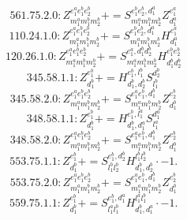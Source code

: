 \documentclass[letterpaper,10pt,fleqn,leqno,onecolumn]{article}
\begin{document}
\begin{equation} \;\;\;\;\;\;  561.75.2.0: Z^{e_{1}^{a}e_{1}^{b}e_{2}^{b}}_{m_{1}^{a}m_{1}^{b}m_{2}^{b}}+=S^{e_{1}^{b}e_{2}^{b},d_{1}^{a}}_{m_{1}^{a}m_{1}^{b}m_{2}^{b}}Z^{e_{1}^{a}}_{d_{1}^{a}} \end{equation}
\begin{equation} \;\;\;\;\;\;  110.24.1.0: Z^{e_{1}^{a}e_{1}^{b}e_{2}^{b}}_{m_{1}^{a}m_{1}^{b}m_{2}^{b}}+=S^{e_{1}^{b}e_{2}^{b},d_{1}^{a}}_{m_{1}^{a}m_{1}^{b}m_{2}^{b}}H^{e_{1}^{a}}_{d_{1}^{a}} \end{equation}
\begin{equation} \;\;\;\;\;\;  120.26.1.0: Z^{e_{1}^{a}e_{1}^{b}e_{2}^{b}}_{m_{1}^{a}m_{1}^{b}m_{2}^{b}}+=S^{e_{1}^{a},d_{1}^{b}d_{2}^{b}}_{m_{1}^{a}m_{1}^{b}m_{2}^{b}}H^{e_{1}^{b}e_{2}^{b}}_{d_{1}^{b}d_{2}^{b}} \end{equation}
\begin{equation} \;\;\;\;\;\;  345.58.1.1: Z^{e_{1}^{b}}_{d_{1}^{b}}+=H^{e_{1}^{b},l_{1}^{b}}_{d_{1}^{b},d_{2}^{b}}S^{d_{2}^{b}}_{l_{1}^{b}} \end{equation}
\begin{equation} \;\;\;\;\;\;  345.58.2.0: Z^{e_{1}^{a}e_{1}^{b}e_{2}^{b}}_{m_{1}^{a}m_{1}^{b}m_{2}^{b}}+=S^{e_{1}^{a}e_{1}^{b},d_{1}^{b}}_{m_{1}^{a}m_{1}^{b}m_{2}^{b}}Z^{e_{2}^{b}}_{d_{1}^{b}} \end{equation}
\begin{equation} \;\;\;\;\;\;  348.58.1.1: Z^{e_{1}^{b}}_{d_{1}^{b}}+=H^{e_{1}^{b},l_{1}^{a}}_{d_{1}^{b},d_{1}^{a}}S^{d_{1}^{a}}_{l_{1}^{a}} \end{equation}
\begin{equation} \;\;\;\;\;\;  348.58.2.0: Z^{e_{1}^{a}e_{1}^{b}e_{2}^{b}}_{m_{1}^{a}m_{1}^{b}m_{2}^{b}}+=S^{e_{1}^{a}e_{1}^{b},d_{1}^{b}}_{m_{1}^{a}m_{1}^{b}m_{2}^{b}}Z^{e_{2}^{b}}_{d_{1}^{b}} \end{equation}
\begin{equation} \;\;\;\;\;\;  553.75.1.1: Z^{e_{1}^{b}}_{d_{1}^{b}}+=S^{e_{1}^{b},d_{2}^{b}}_{l_{1}^{b}l_{2}^{b}}H^{l_{1}^{b}l_{2}^{b}}_{d_{1}^{b},d_{2}^{b}}\cdot -1. \end{equation}
\begin{equation} \;\;\;\;\;\;  553.75.2.0: Z^{e_{1}^{a}e_{1}^{b}e_{2}^{b}}_{m_{1}^{a}m_{1}^{b}m_{2}^{b}}+=S^{e_{1}^{a}e_{1}^{b},d_{1}^{b}}_{m_{1}^{a}m_{1}^{b}m_{2}^{b}}Z^{e_{2}^{b}}_{d_{1}^{b}} \end{equation}
\begin{equation} \;\;\;\;\;\;  559.75.1.1: Z^{e_{1}^{b}}_{d_{1}^{b}}+=S^{e_{1}^{b},d_{1}^{a}}_{l_{1}^{a}l_{1}^{b}}H^{l_{1}^{a}l_{1}^{b}}_{d_{1}^{b},d_{1}^{a}}\cdot -1. \end{equation}
\end{document}
